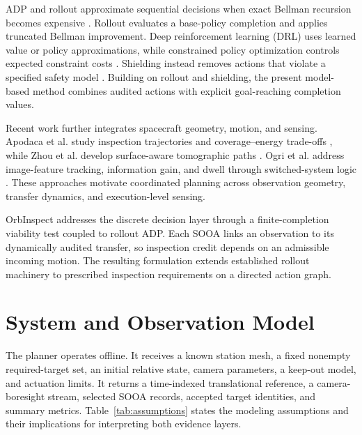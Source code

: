 \documentclass{IEEEtaes}
\theoremstyle{remark}
\theoremstyle{plain}
\begin{document}
ADP and rollout approximate sequential decisions when exact Bellman recursion becomes expensive \cite{bertsekas2020rollout,bertsekas1996neuro}. Rollout evaluates a base-policy completion and applies truncated Bellman improvement. Deep reinforcement learning (DRL) uses learned value or policy approximations, while constrained policy optimization controls expected constraint costs \cite{achiam2017cpo}. Shielding instead removes actions that violate a specified safety model \cite{alshiekh2018shielding}. Building on rollout and shielding, the present model-based method combines audited actions with explicit goal-reaching completion values.

Recent work further integrates spacecraft geometry, motion, and sensing. Apodaca et al. study inspection trajectories and coverage--energy trade-offs \cite{apodaca2025trajectory}, while Zhou et al. develop surface-aware tomographic paths \cite{zhou2026tomographic}. Ogri et al. address image-feature tracking, information gain, and dwell through switched-system logic \cite{ogri2025switched}. These approaches motivate coordinated planning across observation geometry, transfer dynamics, and execution-level sensing.

OrbInspect addresses the discrete decision layer through a finite-completion viability test coupled to rollout ADP. Each SOOA links an observation to its dynamically audited transfer, so inspection credit depends on an admissible incoming motion. The resulting formulation extends established rollout machinery to prescribed inspection requirements on a directed action graph.

\section{System and Observation Model}
\label{sec:system}

The planner operates offline. It receives a known station mesh, a fixed nonempty required-target set, an initial relative state, camera parameters, a keep-out model, and actuation limits. It returns a time-indexed translational reference, a camera-boresight stream, selected SOOA records, accepted target identities, and summary metrics. Table~\ref{tab:assumptions} states the modeling assumptions and their implications for interpreting both evidence layers.
\end{document}
